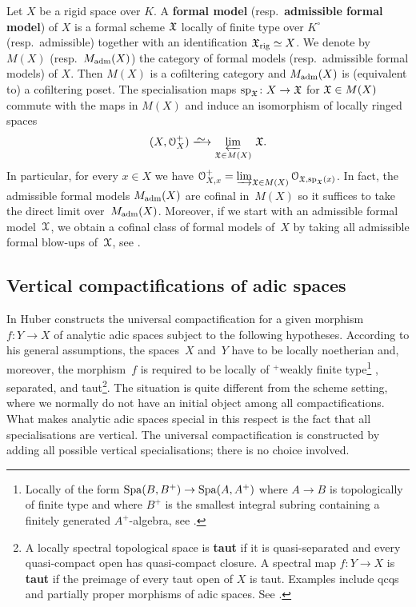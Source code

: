 Let $X$ be a rigid space over $K$. A {\bf formal model} (resp.\ {\bf admissible formal model}) of $X$ is a formal scheme ${\mathfrak{X}}$ locally of finite type over $K^\circ$ (resp.\ admissible) together with an identification ${\mathfrak{X}}_{\rm rig}\simeq X$. We denote by $M(X)$ (resp.\ $M_{\rm adm}(X)$) the category of formal models (resp.\ admissible formal models) of $X$. Then $M(X)$ is a cofiltering category and $M_{\rm adm}(X)$ is (equivalent to) a cofiltering poset. The specialisation maps ${\rm sp}_{\mathfrak{X}}\colon X\to {\mathfrak{X}}$ for ${\mathfrak{X}}\in M(X)$ commute with the maps in $M(X)$ and induce an isomorphism of locally ringed spaces
\[
    (X, \cO_X^+)\isomto \varprojlim_{\fX\in M(X)} \, \fX. 
\]
In particular, for every $x\in X$ we have ${\mathcal O}^+_{X,x} = \varinjlim_{{\mathfrak{X}}\in M(X)} {\mathcal O}_{{\mathfrak{X}}, {\rm sp}_{{\mathfrak{X}}}(x)}$.
In fact, the admissible formal models $M_{\rm adm}(X)$ are cofinal in~$M(X)$ so it suffices to take the direct limit over~$M_{\rm adm}(X)$.
Moreover, if we start with an admissible formal model~${\mathcal X}$, we obtain a cofinal class of formal models of~$X$ by taking all admissible formal blow-ups of~${\mathcal X}$, see \cite[Chapter~II,\S~3.2 and A.5]{FujiwaraKato}.

\subsection{Vertical compactifications of adic spaces}
\label{ss:univ-comp}

In \cite[\S5.1]{HuberBook} Huber constructs the universal compactification for a given morphism $f\colon Y \to X$ of analytic adic spaces subject to the following hypotheses.
According to his general assumptions, the spaces~$X$ and~$Y$ have to be locally noetherian and, moreover, the morphism~$f$ is required to be locally of ${}^+$weakly finite type\footnote{Locally of the form $\operatorname{Spa}(B,B^+)\to\operatorname{Spa}(A,A^+)$ where $A\to B$ is topologically of finite type and where $B^+$ is the smallest integral subring containing a finitely generated $A^+$-algebra, see \cite[Definition 1.2.1]{HuberBook}.} , separated, and taut\footnote{A locally spectral topological space is {\bf taut} if it is quasi-separated and every quasi-compact open has quasi-compact closure. A spectral map $f\colon Y\to X$ is {\bf taut} if the preimage of every taut open of $X$ is taut. Examples include qcqs and partially proper morphisms of adic spaces. See \cite[\S 5.1]{HuberBook}.}.
The situation is quite different from the scheme setting, where we normally do not have an initial object among all compactifications.
What makes analytic adic spaces special in this respect is the fact that all specialisations are vertical.
The universal compactification is constructed by adding all possible vertical specialisations; there is no choice involved.

